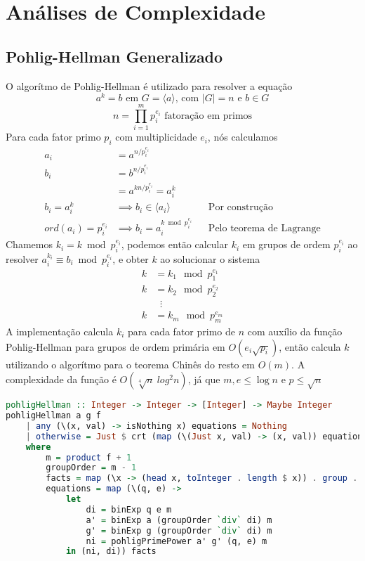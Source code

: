 \documentclass{article}
\begin{document}
\section{Análises de Complexidade}
\subsection{Pohlig-Hellman Generalizado}
O algorítmo de Pohlig-Hellman é utilizado para resolver a equação
$$ a^k = b \text{ em } G = \langle a \rangle\text{, com }|G| = n\text{ e }b \in G$$
$$ n = \prod_{i=1}^{m}p_i^{e_i} \text{ fatoração em primos} $$
Para cada fator primo $p_i$ com multiplicidade $e_i$, nós calculamos
\begin{align*}
    a_i &= a^{n/p_i^{e_i}}\\
    b_i &= b^{n/p_i^{e_i}}\\
        &= a^{k n/p_i^{e_i}} = a_i^k\\
    b_i = a_i^k &\implies b_i \in \langle a_i \rangle            &&\text{Por construção}\\
    ord(a_i) = p_i^{e_i} &\implies b_i = a_i^{k \bmod p_i^{e_i}} &&\text{Pelo teorema de Lagrange}
\end{align*}
Chamemos $ k_i = k \bmod p_i^{e_i} $, podemos então calcular $k_i$ em grupos de ordem $p_i^{e_i}$ ao resolver $a_i^{k_i} \equiv b_i \bmod p_i^{e_i}$, e obter $k$ ao solucionar o sistema
\begin{align*}
    k &= k_1 \mod p_1^{e_1} \\
    k &= k_2 \mod p_2^{e_2} \\
    &\;\;\vdots \\
    k &= k_m \mod p_m^{e_m}
\end{align*}
A implementação calcula $k_i$ para cada fator primo de $n$ com auxílio da função Pohlig-Hellman para grupos de ordem primária em $O(e_i\sqrt{p_i})$, então calcula $k$ utilizando o algorítmo para o teorema Chinês do resto em $O(m)$.
A complexidade da função é $O(\sqrt[4]{n}\ log^2{n})$, já que $m, e \leq \log{n}$ e $p \leq \sqrt{n}$

\noindent\hspace{0.03\linewidth}
\begin{minipage}{.9\linewidth}
\begin{lstlisting}[language=haskell,caption=Pohlig Hellman]
pohligHellman :: Integer -> Integer -> [Integer] -> Maybe Integer
pohligHellman a g f
    | any (\(x, val) -> isNothing x) equations = Nothing
    | otherwise = Just $ crt (map (\(Just x, val) -> (x, val)) equations)
    where
        m = product f + 1
        groupOrder = m - 1
        facts = map (\x -> (head x, toInteger . length $ x)) . group . factorize $ groupOrder
        equations = map (\(q, e) ->
            let
                di = binExp q e m
                a' = binExp a (groupOrder `div` di) m
                g' = binExp g (groupOrder `div` di) m
                ni = pohligPrimePower a' g' (q, e) m
            in (ni, di)) facts
\end{lstlisting}
\end{minipage}
\end{document}
